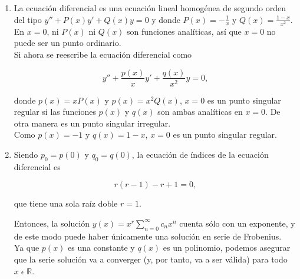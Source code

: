 \begin{enumerate}
[label=(\alph*)]
    \item La ecuación diferencial
    es una ecuación lineal homogénea de segundo orden del tipo $y'' + P(x) y' + Q(x) y = 0$ y donde $P(x) = -\frac{1}{x}$
    y $Q(x) = \frac{1-x}{x^2}$. En $x = 0$, ni $P(x)$ ni $Q(x)$ son funciones analíticas, así que $x=0$ no
    puede ser un punto ordinario.\\

    Si ahora se reescribe la ecuación diferencial como

    \begin{equation*}
        y'' + \frac{p(x)}{x} y' + \frac{q(x)}{x^2} y = 0,
    \end{equation*}

    donde $p(x) = x P(x)$ y $p(x) = x^2 Q(x)$, $x = 0$ es un punto singular regular si las funciones $p(x)$ y $q(x)$
    son ambas analíticas en $x = 0$. De otra manera es un punto singular irregular.\\

    Como $p(x) = -1$ y $q(x) = 1 - x$, $x = 0$ es un punto singular regular.

    \vspace{20px}
    \item Siendo $p_0 = p(0)$ y $q_0 = q(0)$, la ecuación de índices de la ecuación diferencial es


    \begin{equation*}
        r(r-1) - r + 1 = 0,
    \end{equation*}

    que tiene una sola raíz doble $r = 1$.

    Entonces, la solución $y(x) = x^r \sum_{n=0}^\infty c_n x^n$
    cuenta sólo con un exponente, y de este modo puede
    haber únicamente una solución en serie de Frobenius.\\

    Ya que $p(x)$ es una constante y $q(x)$ es un polinomio, podemos asegurar que la serie solución va
    a converger (y, por tanto, va a ser válida) para todo $x\;\epsilon\;\mathbb{R}$.


\end{enumerate}
